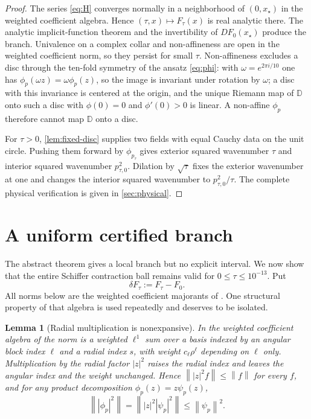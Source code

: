 \documentclass[11pt]{amsart}
\newtheorem{lemma}[theorem]{Lemma}
\newcommand{\D}{\mathbb D}
\newcommand{\norm}[1]{\left\lVert #1\right\rVert}
\newcommand{\abs}[1]{\left\lvert #1\right\rvert}
\begin{document}
\begin{proof}
The series \eqref{eq:H} converges normally in a neighborhood of
$(0,x_\star)$ in the weighted coefficient algebra.  Hence
$(\tau,x)\mapsto F_\tau(x)$ is real analytic there.  The analytic
implicit-function theorem and the invertibility of $DF_0(x_\star)$ produce
the branch.  Univalence on a complex collar and non-affineness are open in
the weighted coefficient norm, so they persist for small $\tau$.
Non-affineness excludes a disc through the ten-fold symmetry of the ansatz
\eqref{eq:phi}: with $\omega=e^{2\pi i/10}$ one has
$\phi_p(\omega z)=\omega\phi_p(z)$, so the image is invariant under
rotation by $\omega$; a disc with this invariance is centered at the
origin, and the unique Riemann map of $\D$ onto such a disc with
$\phi(0)=0$ and $\phi'(0)>0$ is linear.  A non-affine $\phi_p$ therefore
cannot map $\D$ onto a disc.

For $\tau>0$, \cref{lem:fixed-disc} supplies two fields with equal Cauchy
data on the unit circle.  Pushing them forward by $\phi_{p_\tau}$ gives
exterior squared wavenumber $\tau$ and interior squared wavenumber
$p_{\tau,0}^2$.  Dilation by $\sqrt\tau$ fixes the exterior wavenumber at
one and changes the interior squared wavenumber to
$p_{\tau,0}^2/\tau$.  The complete physical verification is given in
\cref{sec:physical}.
\end{proof}

\section{A uniform certified branch}\label{sec:quantitative}

The abstract theorem gives a local branch but no explicit interval.  We now
show that the entire Schiffer contraction ball remains valid for
$0\le\tau\le10^{-13}$.  Put
\[
  \delta F_\tau:=F_\tau-F_0.
\]
All norms below are the weighted coefficient majorants of
\cite{ColbrookStepaniants2026}.  One structural property of that algebra is
used repeatedly and deserves to be isolated.

\begin{lemma}[Radial multiplication is nonexpansive]\label{lem:radial}
In the weighted coefficient algebra of
\cite{ColbrookStepaniants2026,ColbrookStepaniantsCert2026} the norm is a
weighted $\ell^1$ sum over a basis indexed by an angular block index $\ell$
and a radial index $s$, with weight $c_\ell\rho^\ell$ depending on $\ell$
only.  Multiplication by the radial factor $\abs z^2$ raises the radial
index and leaves the angular index and the weight unchanged.  Hence
$\norm{\abs z^2f}\le\norm f$ for every $f$, and for any product
decomposition $\phi_p(z)=z\psi_p(z)$,
\[
  \norm{\abs{\phi_p}^2}
  =\norm{\abs z^2\abs{\psi_p}^2}
  \le\norm{\psi_p}^2 .
\]
\end{lemma}
\end{document}
